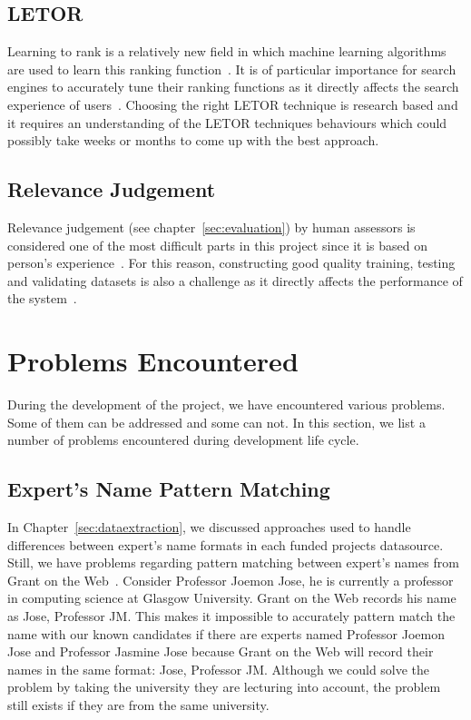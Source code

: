 \subsection{LETOR}
Learning to rank is a relatively new
field in which machine learning algorithms are used to learn this ranking function~\cite{yahooLETOR}.
It is of particular importance for search engines to accurately tune their ranking functions as
it directly affects the search experience of users~\cite{yahooLETOR}.
Choosing the right LETOR technique is research based and it requires an 
understanding of the LETOR techniques behaviours which could possibly take weeks or months to come up with the best approach.

\subsection{Relevance Judgement}\label{sec:relevanceJudgement}
Relevance judgement (see chapter~\ref{sec:evaluation}) by human assessors is considered one of the most difficult parts in this project 
since it is based on person's experience~\cite{jjtextclassification}.
For this reason, constructing good quality training, testing and validating datasets is also a challenge as it directly affects the performance of 
the system~\cite{craig}.


\section{Problems Encountered}\label{sec:problems}
During the development of the project, we have encountered various problems. Some of them can be addressed and some can not. In this section, we 
list a number of problems encountered during development life cycle.

\subsection{Expert's Name Pattern Matching}
In Chapter~\ref{sec:dataextraction}, we discussed approaches used to handle differences between expert's name formats in each funded projects datasource. 
Still, we have problems regarding pattern matching between expert's names from Grant on the Web~\cite{gow}. Consider Professor Joemon Jose,
he is currently a professor in computing science at Glasgow University. Grant on the Web records his name as Jose, Professor JM.
This makes it impossible to accurately pattern match the name with our known candidates if there are experts named Professor Joemon Jose and 
Professor Jasmine Jose because Grant on the Web will record their names in the same format: Jose, Professor JM. Although we could solve the problem by taking 
the university they are lecturing into account, the problem still exists if they are from the same university.

